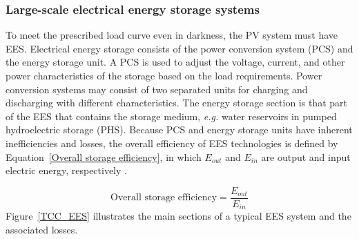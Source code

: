 \subsubsection{Large-scale electrical energy storage systems}
To meet the prescribed load curve even in darkness, the PV system must have EES. Electrical energy storage consists of the power conversion system (PCS) and the energy storage unit. A PCS is used to adjust the voltage, current, and other power characteristics of the storage based on the load requirements. Power conversion systems may consist of two separated units for charging and discharging with different characteristics. The energy storage section is that part of the EES that contains the storage medium, \emph{e.g.} water reservoirs in pumped hydroelectric storage (PHS). Because PCS and energy storage units have inherent inefficiencies and losses, the overall efficiency of EES technologies is defined by Equation~\ref{Overall storage efficiency}, in which $E_{out}$ and $E_{in}$ are output and input electric energy, respectively \cite{Kaldellis2009}.

\begin{equation}
\textrm{Overall storage efficiency}=\frac{E_{out}}{E_{in}} \label{Overall storage efficiency}
\end{equation}
Figure~\ref{TCC_EES} illustrates the main sections of a typical EES system and the associated losses.

